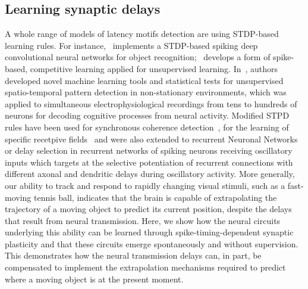 \documentclass[brainsci, %
               review,submit,pdftex,moreauthors%
               ]{Definitions/mdpi}
\begin{document}
\subsection{Learning synaptic delays}
A whole range of models of latency motifs detection are using STDP-based learning rules. For instance,~\citep{kheradpisheh_stdp-based_2018} implements a STDP-based spiking deep convolutional neural networks for object recognition;~\citep{tavanaei_representation_2018} develops a form of spike-based, competitive learning applied for unsupervised learning. In~\citep{russo_cell_2017}, authors developed novel machine learning tools and statistical tests for unsupervised spatio-temporal pattern detection in non-stationary environments, which was applied to simultaneous electrophysiological recordings from tens to hundreds of neurons for decoding cognitive processes from neural activity.
%
Modified STPD rules have been used for synchronous coherence detection~\citep{perrinet_coherence_2002}, for the learning of specific recetpive fields~\citep{perrinet_networks_2001} and were also extended to recurrent Neuronal Networks~\citep{gilson_stdp_2010} or delay selection in recurrent networks of spiking neurons receiving oscillatory inputs\citep{kerr_delay_2013} which targets at the selective potentiation of recurrent connections with different axonal and dendritic delays during oscillatory activity. More generally, our ability to track and respond to rapidly changing visual stimuli, such as a fast-moving tennis ball, indicates that the brain is capable of extrapolating the trajectory of a moving object to predict its current position, despite the delays that result from neural transmission. Here, we show how the neural circuits underlying this ability can be learned through spike-timing-dependent synaptic plasticity and that these circuits emerge spontaneously and without supervision. This demonstrates how the neural transmission delays can, in part, be compensated to implement the extrapolation mechanisms required to predict where a moving object is at the present moment.~\citep{burkitt_predictive_2021}
\end{document}
